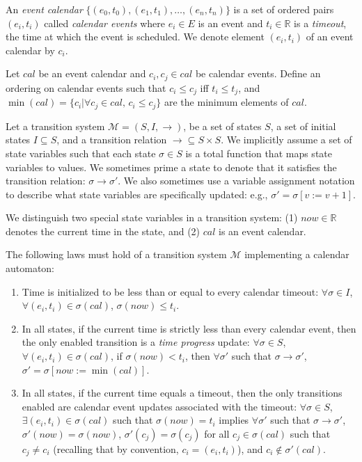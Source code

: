 An \emph{event calendar} $\{ (e_0, t_0), (e_1, t_1), \ldots, (e_n, t_n)
\}$ is a set of ordered pairs $(e_i, t_i)$ called \emph{calendar events}
where $e_i \in E$ is an event and $t_i \in \mathbb{R}$ is a
\emph{timeout}, the time at which the event is scheduled. We denote
element $(e_i, t_i)$ of an event calendar by $c_i$.

Let $cal$ be an event calendar and $c_i, c_j \in cal$ be calendar
events. Define an ordering on calendar events such that $c_i \leq c_j$
iff $t_i \leq t_j$, and $\min(cal) = \{ c_i | \forall c_j \in cal, \,
c_i \leq c_j  \}$ are the minimum elements of $cal$.

Let a transition system $\mathcal{M} = (S, I, \rightarrow)$, be a set of
states $S$, a set of initial states $I \subseteq S$, and a transition
relation $\rightarrow \subseteq S \times S$. We implicitly assume a set
of state variables such that each state $\sigma \in S$ is a total
function that maps state variables to values. We sometimes prime a state
to denote that it satisfies the transition relation: $\sigma \rightarrow
\sigma'$. We also sometimes use a variable assignment notation to
describe what state variables are specifically updated: e.g., $\sigma' =
\sigma[v := v+1]$.

We distinguish two special state variables in a transition system: (1)
$now \in \mathbb{R}$ denotes the current time in the state, and (2)
$cal$ is an event calendar.

The following laws must hold of a transition system $\mathcal{M}$
implementing a calendar automaton:

\begin{enumerate}

\item \label{cal:a} Time is initialized to be less than or equal to
every calendar timeout: $\forall \sigma \in I$, $\forall (e_i, t_i) \in
\sigma(cal)$, $\sigma(now) \leq t_i$.

\item \label{cal:c} In all states, if the current time is strictly less
than every calendar event, then the only enabled transition is a
\emph{time progress} update: $\forall \sigma \in S$, $\forall (e_i, t_i)
\in \sigma(cal)$, if $\sigma(now) < t_i$, then $\forall \sigma'$ such
that $\sigma \rightarrow \sigma'$, $\sigma' = \sigma[now := \min(cal)]$.

\item \label{cal:d} In all states, if the current time equals a timeout,
then the only transitions enabled are calendar event updates associated
with the timeout: $\forall \sigma \in S$, $\exists (e_i, t_i) \in
\sigma(cal)$ such that $\sigma(now) = t_i$ implies $\forall \sigma'$
such that $\sigma \rightarrow \sigma'$, $\sigma'(now) = \sigma(now)$,
$\sigma'(c_j) = \sigma(c_j)$ for all $c_j \in \sigma(cal)$ such that
$c_j \neq c_i$ (recalling that by convention, $c_i = (e_i, t_i)$), and
$c_i \notin \sigma'(cal)$.

\end{enumerate}

